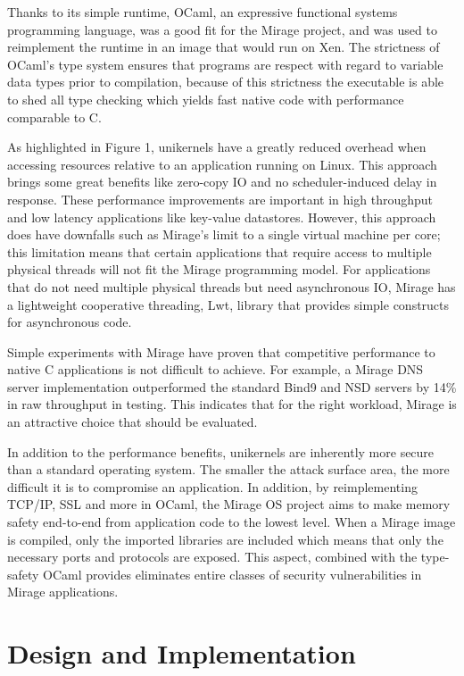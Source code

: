 \documentclass[english,10pt,twocolumn]{article}
\begin{document}
Thanks to its simple runtime, OCaml, an expressive functional systems programming language, was a good fit for the Mirage project, and was used to re\-implement the runtime in an image that would run on Xen.
The strictness of OCaml's type system ensures that programs are respect with regard to variable data types prior to compilation, because of this strictness the executable is able to shed all type checking which yields fast native code with performance comparable to C.

As highlighted in Figure 1, unikernels have a greatly reduced overhead when accessing resources relative to an application running on Linux.
This approach brings some great benefits like zero-copy IO and no scheduler-induced delay in response.
These performance improvements are important in high throughput and low latency applications like key-value datastores.
However, this approach does have downfalls such as Mirage's limit to a single virtual machine per core; this limitation means that certain applications that require access to multiple physical threads will not fit the Mirage programming model.
For applications that do not need multiple physical threads but need asynchronous IO, Mirage has a lightweight cooperative threading, Lwt, library that provides simple constructs for asynchronous code.

Simple experiments with Mirage have proven that competitive performance to native C applications is not difficult to achieve.
For example, a Mirage DNS server implementation outperformed the standard Bind9 and NSD servers by 14\% in raw throughput in testing.
This indicates that for the right workload, Mirage is an attractive choice that should be evaluated.

In addition to the performance benefits, unikernels are inherently more secure than a standard operating system.
The smaller the attack surface area, the more difficult it is to compromise an application.
In addition, by reimplementing TCP/IP, SSL and more in OCaml, the Mirage OS project aims to make memory safety end-to-end from application code to the lowest level.
When a Mirage image is compiled, only the imported libraries are included which means that only the necessary ports and protocols are exposed.
This aspect, combined with the type-safety OCaml provides eliminates entire classes of security vulnerabilities in Mirage applications.


\section{Design and Implementation}
\end{document}
